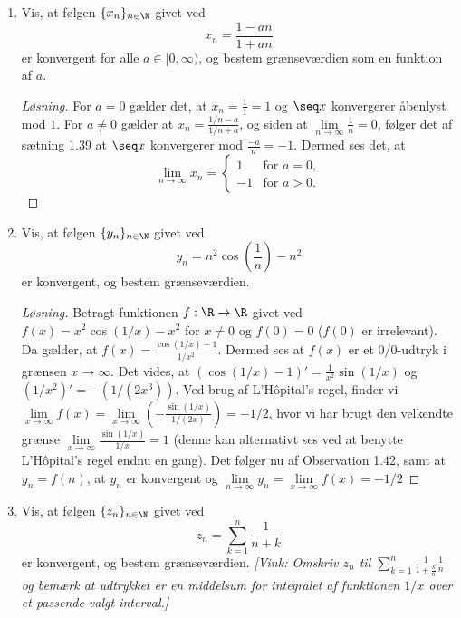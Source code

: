 \begin{opg}\hfill
	\begin{enumerate}
		\item Vis, at f\o{}lgen $\{x_n\}_{n\in\N}$ givet ved
		\[
		x_n=\frac{1-an}{1+an}
		\]	
		er konvergent for alle $a\in [0,\infty)$, og bestem gr\ae{}nsev\ae{}rdien som en funktion af $a$.
		
		\begin{proof}[Løsning]
			For $ a=0 $ gælder det, at $ x_n=\frac{1}{1}=1 $ og $ \seq x $ konvergerer åbenlyst mod $ 1 $. For $ a\neq 0 $ gælder at $ x_n=\frac{1/n-a}{1/n+a} $, og siden at $ \lim\limits_{n\to\infty}\frac{1}{n}=0 $, følger det af sætning 1.39 at $ \seq x $ konvergerer mod $ \frac{-a}{a}=-1 $. Dermed ses det, at \begin{equation}
			\lim\limits_{n\to\infty}x_n=\begin{cases}
			1& \text{for }a=0,\\
			-1&\text{for }a>0.
			\end{cases}
			\end{equation}
		\end{proof}
		
		
		\item Vis, at f\o{}lgen $\{y_n\}_{n\in\N}$ givet ved
		\[
		y_n=n^2\cos\left(\frac1n\right)-n^2
		\]	
		er konvergent, og bestem gr\ae{}nsev\ae{}rdien.
		
		\begin{proof}[Løsning]
			Betragt funktionen $ f:\R\to\R  $ givet ved $ f(x)=x^2\cos(1/x)-x^2 $ for $ x\neq 0 $ og $ f(0)=0 $ ($ f(0) $ er irrelevant). Da gælder, at $ f(x)=\frac{\cos(1/x)-1}{1/x^2} $. Dermed ses at $ f(x) $ er et $ 0/0 $-udtryk i grænsen $ x\to\infty $. Det vides, at $ (\cos(1/x)-1)'=\frac{1}{x^2}\sin(1/x) $ og $ (1/x^2)'=-(1/(2x^3)) $. Ved brug af L'H\^opital's regel, finder vi $ \lim\limits_{x\to\infty}f(x)=\lim\limits_{x\to\infty}\left(-\frac{\sin(1/x)}{1/(2x)}\right)=-1/2 $, hvor vi har brugt den velkendte grænse $ \lim\limits_{x\to\infty}\frac{\sin(1/x)}{1/x}=1 $ (denne kan alternativt ses ved at benytte L'H\^opital's regel endnu en gang). Det følger nu af Observation 1.42, samt at $ y_n=f(n) $, at $ y_n $ er konvergent og $ \lim\limits_{n\to\infty}y_n=\lim\limits_{x\to\infty}f(x)=-1/2 $ 
		\end{proof}
		
		
		\item Vis, at f\o{}lgen $\{z_n\}_{n\in\N}$ givet ved
		\[
		z_n=\sum_{k=1}^n\frac1{n+k}
		\]	
		er konvergent, og bestem gr\ae{}nsev\ae{}rdien. \textsl{[Vink: Omskriv 
			$
			z_n$ til $\sum_{k=1}^n\frac1{1+\frac kn}\frac 1n
			$
			og bem\ae{}rk at udtrykket er en middelsum for integralet af funktionen $1/x$ over et passende valgt interval.]}
		

\end{enumerate}
\end{opg}
